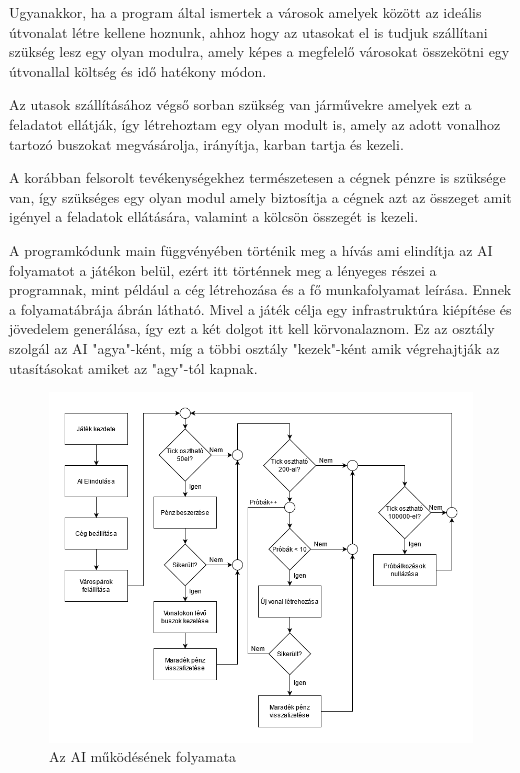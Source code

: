 Ugyanakkor, ha a program által ismertek a városok amelyek között az ideális útvonalat létre kellene hoznunk, ahhoz hogy az utasokat el is tudjuk szállítani szükség lesz egy olyan modulra, amely képes a megfelelő városokat összekötni egy útvonallal költség és idő hatékony módon.

Az utasok szállításához végső sorban szükség van járművekre amelyek ezt a feladatot ellátják, így létrehoztam egy olyan modult is, amely az adott vonalhoz tartozó buszokat megvásárolja, irányítja, karban tartja és kezeli.

A korábban felsorolt tevékenységekhez természetesen a cégnek pénzre is szüksége van, így szükséges egy olyan modul amely biztosítja a cégnek azt az összeget amit igényel a feladatok ellátására, valamint a kölcsön összegét is kezeli.



A programkódunk main függvényében történik meg a hívás ami elindítja az AI folyamatot a játékon belül, ezért itt történnek meg a lényeges részei a programnak, mint például a cég létrehozása és a fő munkafolyamat leírása. Ennek a folyamatábrája  ábrán látható. Mivel a játék célja egy infrastruktúra kiépítése és jövedelem generálása, így ezt a két dolgot itt kell körvonalaznom. Ez az osztály szolgál az AI "agya"-ként, míg a többi osztály "kezek"-ként amik végrehajtják az utasításokat amiket az "agy"-tól kapnak.

\begin{figure}
	\centering
	\includegraphics[scale=0.5]{images/folyamat.png}
	\caption{Az AI működésének folyamata}
	\label{fig:folyamat}
\end{figure}

